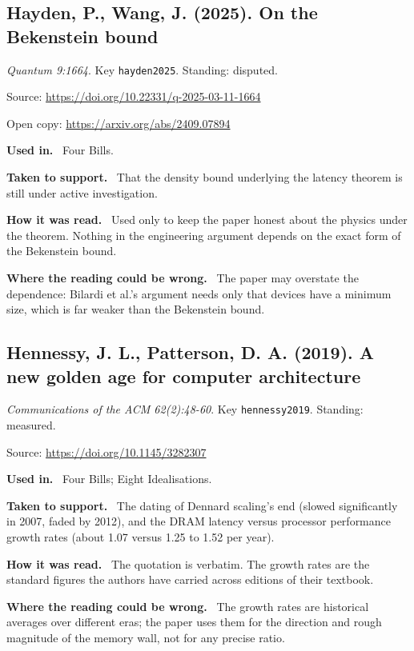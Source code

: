 \documentclass[11pt,oneside]{article}
\newcommand{\field}[1]{\par\noindent\textbf{\color{accent}#1.}\ }
\begin{document}
\hypertarget{src:hayden2025}{}
\subsection*{Hayden, P., Wang, J. (2025). On the Bekenstein bound}
\noindent\small\emph{Quantum 9:1664}. Key \texttt{hayden2025}. Standing: disputed.
\par\noindent\small Source: \url{https://doi.org/10.22331/q-2025-03-11-1664}
\par\noindent\small Open copy: \url{https://arxiv.org/abs/2409.07894}
\normalsize
\field{Used in} Four Bills.
\field{Taken to support} That the density bound underlying the latency theorem is still under active investigation.
\field{How it was read} Used only to keep the paper honest about the physics under the theorem. Nothing in the engineering argument depends on the exact form of the Bekenstein bound.
\field{Where the reading could be wrong} The paper may overstate the dependence: Bilardi et al.'s argument needs only that devices have a minimum size, which is far weaker than the Bekenstein bound.

\hypertarget{src:hennessy2019}{}
\subsection*{Hennessy, J. L., Patterson, D. A. (2019). A new golden age for computer architecture}
\noindent\small\emph{Communications of the ACM 62(2):48-60}. Key \texttt{hennessy2019}. Standing: measured.
\par\noindent\small Source: \url{https://doi.org/10.1145/3282307}
\normalsize
\field{Used in} Four Bills; Eight Idealisations.
\field{Taken to support} The dating of Dennard scaling's end (slowed significantly in 2007, faded by 2012), and the DRAM latency versus processor performance growth rates (about 1.07 versus 1.25 to 1.52 per year).
\field{How it was read} The quotation is verbatim. The growth rates are the standard figures the authors have carried across editions of their textbook.
\field{Where the reading could be wrong} The growth rates are historical averages over different eras; the paper uses them for the direction and rough magnitude of the memory wall, not for any precise ratio.

\hypertarget{src:hodges1983}{}
\end{document}
